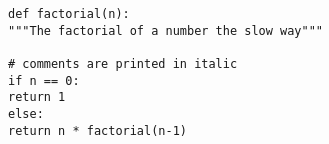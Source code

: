 \documentclass[10pt]{article}
\newcommand{\code}[2]{
\hrulefill
\subsection*{#1}

\vspace{2em}
}
\begin{document}
 
 
\begin{lstlisting}
def factorial(n):
"""The factorial of a number the slow way"""
 
# comments are printed in italic
if n == 0:
return 1
else:
return n * factorial(n-1)
\end{lstlisting}
 
 
\end{document}
